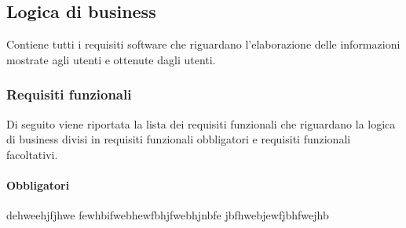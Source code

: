 \subsection{Logica di business}
Contiene tutti i requisiti software che riguardano l'elaborazione delle informazioni mostrate agli utenti e ottenute dagli utenti.

\subsubsection{Requisiti funzionali}
Di seguito viene riportata la lista dei requisiti funzionali che riguardano la logica di business divisi in requisiti funzionali obbligatori e requisiti funzionali facoltativi.


\paragraph{Obbligatori}
dehweehjfjhwe fewhbifwebhewfbhjfwebhjnbfe jbfhwebjewfjbhfwejhb
